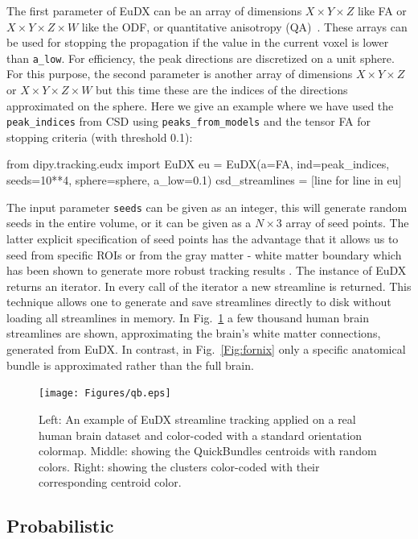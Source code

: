 \documentclass{bioinfo}
\begin{document}
The first parameter of EuDX can be an array of dimensions $X\times Y\times Z$
like FA or $X\times Y\times Z \times W$ like the ODF, or quantitative
anisotropy (QA)~\citep{yeh-etal:10}. These arrays can be used for stopping the
propagation if the value in the current voxel is lower than
\texttt{a\_low}. For efficiency, the peak directions are discretized on a unit
sphere. For this purpose, the second parameter is another array of dimensions
$X\times Y\times Z$ or $X\times Y\times Z\times W$ but this time these are the
indices of the directions approximated on the sphere. Here we give an example
where we have used the \texttt{peak\_indices} from CSD using \texttt{peaks\_from\_models}
and the tensor FA for stopping criteria (with threshold 0.1):
\begin{python}
from dipy.tracking.eudx import EuDX
eu = EuDX(a=FA, ind=peak_indices, seeds=10**4,
          sphere=sphere, a_low=0.1)
csd_streamlines = [line for line in eu]
\end{python}
The input parameter \texttt{seeds} can be given as an integer, this will
generate random seeds in the entire volume, or it can be given as a $N\times 3$
array of seed points. The latter explicit specification of seed points has the
advantage that it allows us to seed from specific ROIs or from the gray matter
- white matter boundary which has been shown to generate more robust tracking
results \citep{Cote2013tractometer}. The instance of EuDX returns an
iterator. In every call of the iterator a new streamline is returned. This
technique allows one to generate and save streamlines directly to disk without loading all
streamlines in memory. In Fig.~\ref{Fig:pretty_streamlines} a few thousand
human brain streamlines are shown, approximating the brain's white matter connections,
generated from EuDX. In contrast, in Fig.~\ref{Fig:fornix} only a specific anatomical bundle is
approximated rather than the full brain.

\begin{figure}[!htb]
\texttt{[image: Figures/qb.eps]}
\centering{}
\caption{Left: An example of EuDX streamline tracking applied on a real
  human brain dataset and color-coded with a standard orientation colormap.
  Middle: showing the QuickBundles centroids with random colors. Right: showing
  the clusters color-coded with their corresponding centroid color.
  \label{Fig:pretty_streamlines}}
\end{figure}

\subsection{Probabilistic}
\end{document}
